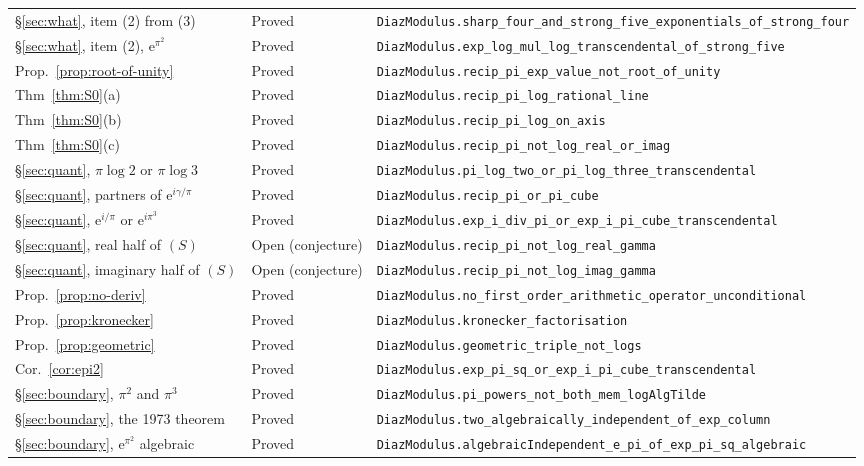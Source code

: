 \documentclass[11pt,a4paper]{article}
\theoremstyle{plain}
\theoremstyle{definition}
\newcommand{\e}{\mathrm{e}}
\begin{document}
\begin{center}
\begin{longtable}{@{}llp{6.2cm}@{}}
\S\ref{sec:what}, item (2) from (3) & Proved & \nolinkurl{DiazModulus.sharp_four_and_strong_five_exponentials_of_strong_four} \\
\S\ref{sec:what}, item (2), $\e^{\pi^{2}}$ & Proved & \nolinkurl{DiazModulus.exp_log_mul_log_transcendental_of_strong_five} \\
Prop.~\ref{prop:root-of-unity} & Proved & \nolinkurl{DiazModulus.recip_pi_exp_value_not_root_of_unity} \\
Thm~\ref{thm:S0}(a) & Proved & \nolinkurl{DiazModulus.recip_pi_log_rational_line} \\
Thm~\ref{thm:S0}(b) & Proved & \nolinkurl{DiazModulus.recip_pi_log_on_axis} \\
Thm~\ref{thm:S0}(c) & Proved & \nolinkurl{DiazModulus.recip_pi_not_log_real_or_imag} \\
\S\ref{sec:quant}, $\pi\log2$ or $\pi\log3$ & Proved & \nolinkurl{DiazModulus.pi_log_two_or_pi_log_three_transcendental} \\
\S\ref{sec:quant}, partners of $\e^{i\gamma/\pi}$ & Proved & \nolinkurl{DiazModulus.recip_pi_or_pi_cube} \\
\S\ref{sec:quant}, $\e^{i/\pi}$ or $\e^{i\pi^{3}}$ & Proved & \nolinkurl{DiazModulus.exp_i_div_pi_or_exp_i_pi_cube_transcendental} \\
\S\ref{sec:quant}, real half of $(S)$ & Open (conjecture) & \nolinkurl{DiazModulus.recip_pi_not_log_real_gamma} \\
\S\ref{sec:quant}, imaginary half of $(S)$ & Open (conjecture) & \nolinkurl{DiazModulus.recip_pi_not_log_imag_gamma} \\
Prop.~\ref{prop:no-deriv} & Proved & \nolinkurl{DiazModulus.no_first_order_arithmetic_operator_unconditional} \\
Prop.~\ref{prop:kronecker} & Proved & \nolinkurl{DiazModulus.kronecker_factorisation} \\
Prop.~\ref{prop:geometric} & Proved & \nolinkurl{DiazModulus.geometric_triple_not_logs} \\
Cor.~\ref{cor:epi2} & Proved & \nolinkurl{DiazModulus.exp_pi_sq_or_exp_i_pi_cube_transcendental} \\
\S\ref{sec:boundary}, $\pi^{2}$ and $\pi^{3}$ & Proved & \nolinkurl{DiazModulus.pi_powers_not_both_mem_logAlgTilde} \\
\S\ref{sec:boundary}, the 1973 theorem & Proved & \nolinkurl{DiazModulus.two_algebraically_independent_of_exp_column} \\
\S\ref{sec:boundary}, $\e^{\pi^{2}}$ algebraic & Proved & \nolinkurl{DiazModulus.algebraicIndependent_e_pi_of_exp_pi_sq_algebraic} \\

\end{longtable}
\end{center}
\end{document}
